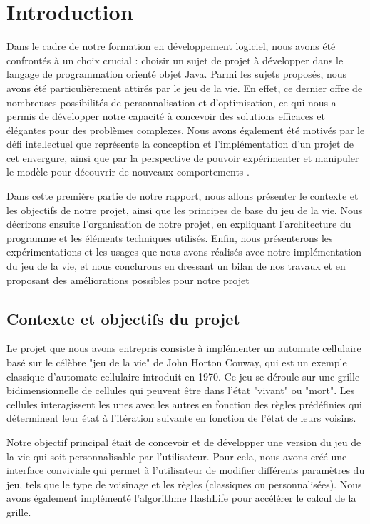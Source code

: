 \section{Introduction}
Dans le cadre de notre formation en développement logiciel, nous avons été confrontés à un choix crucial : choisir un sujet de projet à développer dans le langage de programmation orienté objet Java. Parmi les sujets proposés, nous avons été particulièrement attirés par le jeu de la vie. En effet, ce dernier offre de nombreuses possibilités de personnalisation et d'optimisation, ce qui nous a permis de développer notre capacité à concevoir des solutions efficaces et élégantes pour des problèmes complexes. Nous avons également été motivés par le défi intellectuel que représente la conception et l'implémentation d'un projet de cet envergure, ainsi que par la perspective de pouvoir expérimenter et manipuler le modèle pour découvrir de nouveaux comportements .

Dans cette première partie de notre rapport, nous allons présenter le contexte et les objectifs de notre projet, ainsi que les principes de base du jeu de la vie. Nous décrirons ensuite l'organisation de notre projet, en expliquant l'architecture du programme et les éléments techniques utilisés. Enfin, nous présenterons les expérimentations et les usages que nous avons réalisés avec notre implémentation du jeu de la vie, et nous conclurons en dressant un bilan de nos travaux et en proposant des améliorations possibles pour notre projet
  \subsection{Contexte et objectifs du projet}
 Le projet que nous avons entrepris consiste à implémenter un automate cellulaire basé sur le célèbre "jeu de la vie" de John Horton Conway, qui est un exemple classique d'automate cellulaire introduit en 1970. Ce jeu se déroule sur une grille bidimensionnelle de cellules qui peuvent être dans l'état "vivant" ou "mort". Les cellules interagissent les unes avec les autres en fonction des règles prédéfinies qui déterminent leur état à l'itération suivante en fonction de l'état de leurs voisins.

Notre objectif principal était de concevoir et de développer une version du jeu de la vie qui soit personnalisable par l'utilisateur. Pour cela, nous avons créé une interface conviviale qui permet à l'utilisateur de modifier différents paramètres du jeu, tels que le type de voisinage et les règles (classiques ou personnalisées). Nous avons également implémenté l'algorithme HashLife pour accélérer le calcul de la grille.

